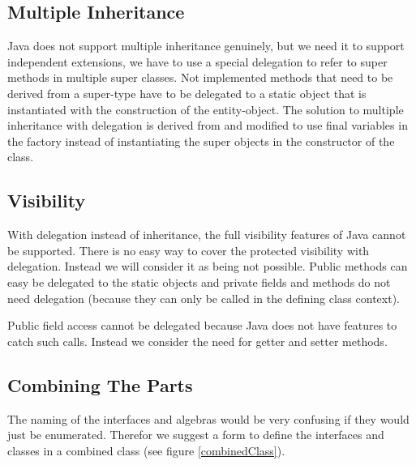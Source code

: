 \documentclass{report}
\begin{document}
\subsection{Multiple Inheritance}
\label{multipleInheritance}

Java does not support multiple inheritance genuinely, but we need it to support independent extensions, we have to use a special delegation to refer to super methods in multiple super classes. Not implemented methods that need to be derived from a super-type have to be delegated to a static object that is instantiated with the construction of the entity-object. The solution to multiple inheritance with delegation is derived from \cite{Tempero-Multiple-2000} and modified to use final variables in the factory instead of instantiating the super objects in the constructor of the class.

\subsection{Visibility}
\label{expressionProblemVisibility}

With delegation instead of inheritance, the full visibility features of Java cannot be supported. There is no easy way to cover the protected visibility with delegation. Instead we will consider it as being not possible. Public methods can easy be delegated to the static objects and private fields and methods do not need delegation (because they can only be called in the defining class context).

Public field access cannot be delegated because Java does not have features to catch such calls. Instead we consider the need for getter and setter methods.

\subsection{Combining The Parts}
\label{combiningTheParts}
The naming of the interfaces and algebras would be very confusing if they would just be enumerated. Therefor we suggest a form to define the interfaces and classes in a combined class (see figure \ref{combinedClass}).
\end{document}
